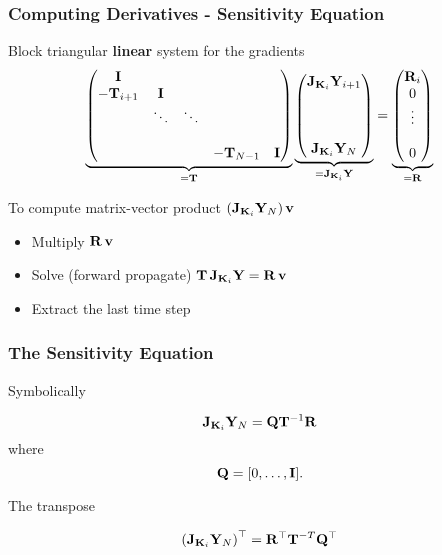 \documentclass[12pt,fleqn,handout]{beamer}
\begin{document}
\begin{frame}[fragile]\frametitle{Computing Derivatives - Sensitivity Equation}

Block triangular {\bf linear} system for the gradients
{\small
\begin{eqnarray*}
	\underbrace{
\begin{pmatrix}
{\bf I}              &                &                &          &       \\
-{\bf T}_{i+1}    &   {\bf I}       &                &          &       \\
                    & \ddots    &  \ddots    &          &      \\
                    &     &      &          &      \\
                    &     &        &   -{\bf T}_{N-1}       & {\bf I}
                    \end{pmatrix}}_{={\bf T}}
					\underbrace{
                    \begin{pmatrix}
                    {\bf J}_{{\bf K}_i}{\bf Y}_{i+1} \\    \\   \\ \\   {\bf J}_{{\bf K}_i}{\bf Y}_{N}
                    \end{pmatrix}}_{= {{\bf J}_{{\bf K}_i} {\bf Y}}} =
					\underbrace{
                    \begin{pmatrix}
                    {\bf R}_i \\  0\\  \vdots \\ \\    0
                    \end{pmatrix}}_{={\bf R}}
\end{eqnarray*}}

To compute matrix-vector product $({\bf J}_{{\bf K}_i}{\bf Y}_{N})\, {\bf v}$
\begin{itemize}
\item Multiply ${\bf R}\, {\bf v}$
\item Solve (forward propagate) ${\bf T}\, {\bf J}_{{\bf K}_i}{\bf Y} = {\bf R}\, {\bf v}$
\item Extract the last time step
\end{itemize}

\end{frame}

\begin{frame}[fragile]\frametitle{The Sensitivity Equation}


Symbolically

$$ {\bf J}_{{\bf K}_i}{\bf Y}_{N}  = {\bf Q} {\bf T}^{-1}  {\bf R}  $$
where
$${\bf Q} = [0,\ldots,{\bf I}]. $$


\bigskip

The transpose

$$ \left({\bf J}_{{\bf K}_i}{\bf Y}_{N}\right)^{\top} =  {\bf R}^{\top} {\bf T}^{-T} {\bf Q}^{\top} $$


\end{frame}
\end{document}
